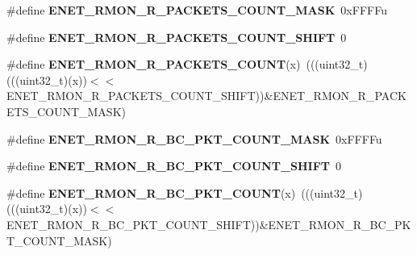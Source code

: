 \begin{DoxyCompactItemize}
\item 
\#define {\bfseries E\+N\+E\+T\+\_\+\+R\+M\+O\+N\+\_\+\+R\+\_\+\+P\+A\+C\+K\+E\+T\+S\+\_\+\+C\+O\+U\+N\+T\+\_\+\+M\+A\+SK}~0x\+F\+F\+F\+Fu\hypertarget{group__ENET__Register__Masks_gaffeecf969d5f86c7d84c936ea078e859}{}\label{group__ENET__Register__Masks_gaffeecf969d5f86c7d84c936ea078e859}

\item 
\#define {\bfseries E\+N\+E\+T\+\_\+\+R\+M\+O\+N\+\_\+\+R\+\_\+\+P\+A\+C\+K\+E\+T\+S\+\_\+\+C\+O\+U\+N\+T\+\_\+\+S\+H\+I\+FT}~0\hypertarget{group__ENET__Register__Masks_gaf03a05af7b6a3435e843eef9f55d8bba}{}\label{group__ENET__Register__Masks_gaf03a05af7b6a3435e843eef9f55d8bba}

\item 
\#define {\bfseries E\+N\+E\+T\+\_\+\+R\+M\+O\+N\+\_\+\+R\+\_\+\+P\+A\+C\+K\+E\+T\+S\+\_\+\+C\+O\+U\+NT}(x)~(((uint32\+\_\+t)(((uint32\+\_\+t)(x))$<$$<$E\+N\+E\+T\+\_\+\+R\+M\+O\+N\+\_\+\+R\+\_\+\+P\+A\+C\+K\+E\+T\+S\+\_\+\+C\+O\+U\+N\+T\+\_\+\+S\+H\+I\+FT))\&E\+N\+E\+T\+\_\+\+R\+M\+O\+N\+\_\+\+R\+\_\+\+P\+A\+C\+K\+E\+T\+S\+\_\+\+C\+O\+U\+N\+T\+\_\+\+M\+A\+SK)\hypertarget{group__ENET__Register__Masks_ga6564e8eb4dfe2940b5233b17edea14a4}{}\label{group__ENET__Register__Masks_ga6564e8eb4dfe2940b5233b17edea14a4}

\item 
\#define {\bfseries E\+N\+E\+T\+\_\+\+R\+M\+O\+N\+\_\+\+R\+\_\+\+B\+C\+\_\+\+P\+K\+T\+\_\+\+C\+O\+U\+N\+T\+\_\+\+M\+A\+SK}~0x\+F\+F\+F\+Fu\hypertarget{group__ENET__Register__Masks_gaea4e90fb7dfef377bdfbd1ec0591c1a9}{}\label{group__ENET__Register__Masks_gaea4e90fb7dfef377bdfbd1ec0591c1a9}

\item 
\#define {\bfseries E\+N\+E\+T\+\_\+\+R\+M\+O\+N\+\_\+\+R\+\_\+\+B\+C\+\_\+\+P\+K\+T\+\_\+\+C\+O\+U\+N\+T\+\_\+\+S\+H\+I\+FT}~0\hypertarget{group__ENET__Register__Masks_gaaadc28d495f1451106da4fcb1e2833ea}{}\label{group__ENET__Register__Masks_gaaadc28d495f1451106da4fcb1e2833ea}

\item 
\#define {\bfseries E\+N\+E\+T\+\_\+\+R\+M\+O\+N\+\_\+\+R\+\_\+\+B\+C\+\_\+\+P\+K\+T\+\_\+\+C\+O\+U\+NT}(x)~(((uint32\+\_\+t)(((uint32\+\_\+t)(x))$<$$<$E\+N\+E\+T\+\_\+\+R\+M\+O\+N\+\_\+\+R\+\_\+\+B\+C\+\_\+\+P\+K\+T\+\_\+\+C\+O\+U\+N\+T\+\_\+\+S\+H\+I\+FT))\&E\+N\+E\+T\+\_\+\+R\+M\+O\+N\+\_\+\+R\+\_\+\+B\+C\+\_\+\+P\+K\+T\+\_\+\+C\+O\+U\+N\+T\+\_\+\+M\+A\+SK)\hypertarget{group__ENET__Register__Masks_gad997cfc2457658dabbd489f83129f403}{}\label{group__ENET__Register__Masks_gad997cfc2457658dabbd489f83129f403}


\end{DoxyCompactItemize}
